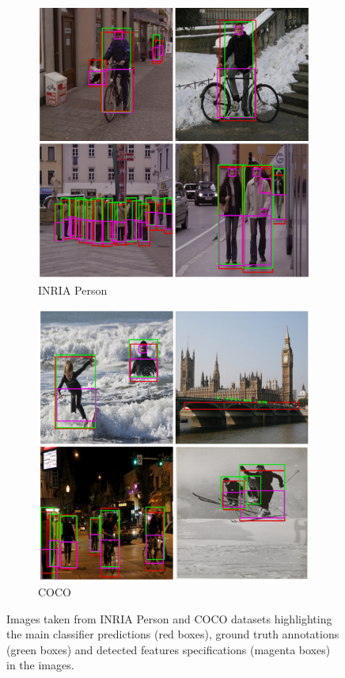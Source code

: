 \begin{figure}[h]
    \centering
    \begin{subfigure}{0.38\textwidth}
        \includegraphics[width=1\textwidth]{other/figures/INRIA_samples_v2.png}
        \caption{INRIA Person}
    \end{subfigure}
    \begin{subfigure}{0.38\textwidth}
        \includegraphics[width=1\textwidth]{other/figures/COCO_samples_v2.png}
        \caption{COCO}
    \end{subfigure}
    \caption{Images taken from INRIA Person and COCO datasets highlighting the main classifier predictions (red boxes), ground truth annotations (green boxes) and detected features specifications (magenta boxes) in the images.}
    \label{summary_pics}
\end{figure}


